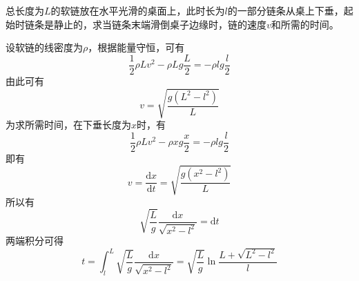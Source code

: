 \begin{question}
总长度为$L$的软链放在水平光滑的桌面上，此时长为$l$的一部分链条从桌上下垂，起始时链条是静止的，求当链条末端滑倒桌子边缘时，链的速度$v$和所需的时间。
\end{question}
\begin{solution}
设软链的线密度为$\rho$，根据能量守恒，可有
\begin{equation*}
	\frac12 \rho L v^2 - \rho L g \frac{L}{2} = -\rho l g \frac{l}{2}
\end{equation*}
由此可有
\begin{equation*}
	v = \sqrt{\frac{g(L^2-l^2)}{L}}
\end{equation*}
为求所需时间，在下垂长度为$x$时，有
\begin{equation*}
	\frac12 \rho L v^2 - \rho x g \frac{x}{2} = -\rho l g \frac{l}{2}
\end{equation*}
即有
\begin{equation*}
	v = \frac{\mathrm{d} x}{\mathrm{d} t} = \sqrt{\frac{g(x^2-l^2)}{L}}
\end{equation*}
所以有
\begin{equation*}
	\sqrt{\frac{L}{g}} \frac{\mathrm{d} x}{\sqrt{x^2-l^2}} = \mathrm{d} t
\end{equation*}
两端积分可得
\begin{equation*}
	t = \int_l^L \sqrt{\frac{L}{g}} \frac{\mathrm{d} x}{\sqrt{x^2-l^2}} = \sqrt{\frac{L}{g}} \ln \frac{L+\sqrt{L^2-l^2}}{l}
\end{equation*}
\end{solution}

